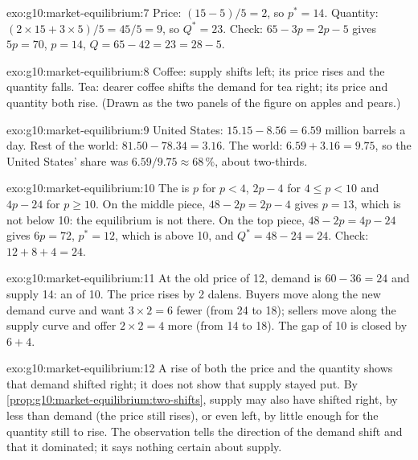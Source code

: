 \begin{solution}{exo:g10:market-equilibrium:7}
Price: $(15 - 5)/5 = 2$, so $p^* = 14$. Quantity: $(2 \times 15 + 3 \times 5)/5 = 45/5 = 9$, so $Q^* = 23$. Check: $65 - 3p = 2p - 5$ gives $5p = 70$,
$p = 14$, $Q = 65 - 42 = 23 = 28 - 5$.
\end{solution}

\begin{solution}{exo:g10:market-equilibrium:8}
Coffee: supply shifts left; its price rises and the quantity falls. Tea: dearer coffee shifts the demand for tea right; its price and quantity both
rise. (Drawn as the two panels of the figure on apples and pears.)
\end{solution}

\begin{solution}{exo:g10:market-equilibrium:9}
United States: $15.15 - 8.56 = 6.59$ million barrels a day. Rest of the world: $81.50 - 78.34 = 3.16$. The world: $6.59 + 3.16 = 9.75$, so the
United States' share was $6.59/9.75 \approx 68\,\%$, about two-thirds.
\end{solution}

\begin{solution}{exo:g10:market-equilibrium:10}
The  is $p$ for $p < 4$, $2p - 4$ for $4 \le p < 10$ and $4p - 24$ for $p \ge 10$. On the middle piece, $48 - 2p = 2p - 4$ gives $p = 13$,
which is not below 10: the equilibrium is not there. On the top piece, $48 - 2p = 4p - 24$ gives $6p = 72$, $p^* = 12$, which is above 10, and $Q^* =
48 - 24 = 24$. Check: $12 + 8 + 4 = 24$.
\end{solution}

\begin{solution}{exo:g10:market-equilibrium:11}
At the old price of 12, demand is $60 - 36 = 24$ and supply 14: an  of 10. The price rises by 2 dalens. Buyers move along the new demand
curve and want $3 \times 2 = 6$ fewer (from 24 to 18); sellers move along the supply curve and offer $2 \times 2 = 4$ more (from 14 to 18). The gap of
10 is closed by $6 + 4$.
\end{solution}

\begin{solution}{exo:g10:market-equilibrium:12}
A rise of both the price and the quantity shows that demand shifted right; it does not show that supply stayed put. By
\cref{prop:g10:market-equilibrium:two-shifts}, supply may also have shifted right, by less than demand (the price still rises), or even left, by
little enough for the quantity still to rise. The observation tells the direction of the demand shift and that it dominated; it says nothing
certain about supply.
\end{solution}

